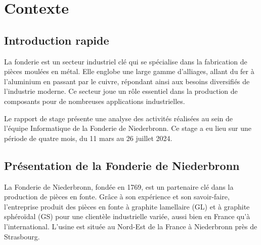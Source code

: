 \documentclass[12pt]{article}
\begin{document}
\newpage

\tableofcontents

\newpage




    





\section{Contexte }


\subsection{Introduction rapide}


La fonderie est un secteur industriel clé qui se spécialise dans la 
fabrication de pièces moulées en métal. Elle englobe une large gamme 
d'alliages, allant du fer à l'aluminium en passant par le cuivre, 
répondant ainsi aux besoins diversifiés de l'industrie moderne. 
Ce secteur joue un rôle essentiel dans la production de composants 
pour de nombreuses applications industrielles.

Le rapport de stage présente une analyse des activités réalisées 
au sein de l'équipe Informatique de la Fonderie de Niederbronn. Ce stage 
a eu lieu sur une période de quatre mois, du 11 mars au 26 juillet 2024. 



\subsection{Présentation de la Fonderie de Niederbronn}


La Fonderie de Niederbronn, fondée en 1769, est un partenaire clé dans la production de pièces 
en fonte. Grâce à son expérience et son savoir-faire, l'entreprise produit des pièces en fonte 
à graphite lamellaire (GL) et à graphite sphéroïdal (GS) pour une clientèle industrielle variée,
aussi bien en France qu'à l'international. L’usine est située au Nord-Est de la France 
à Niederbronn près de Strasbourg.
\end{document}
